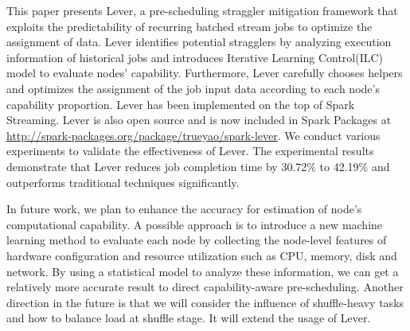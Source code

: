 \documentclass[10pt,conference,compsocconf,letterpaper]{IEEEtran}
\begin{document}
  This paper presents Lever, a pre-scheduling straggler mitigation framework that exploits the predictability of recurring batched stream jobs to optimize the assignment of data. Lever identifies potential stragglers by analyzing execution information of historical jobs and introduces Iterative Learning Control(ILC) model to evaluate nodes' capability. Furthermore, Lever carefully chooses helpers and optimizes the assignment of the job input data according to each node's capability proportion. Lever has been implemented on the top of Spark Streaming. Lever is also open source and is now included in Spark Packages at \url{http://spark-packages.org/package/trueyao/spark-lever}. We conduct various experiments to validate the effectiveness of Lever. The experimental results demonstrate that Lever reduces job completion time by 30.72\% to 42.19\% and outperforms traditional techniques significantly.

  In future work, we plan to enhance the accuracy for estimation of node's computational capability. A possible approach is to introduce a new machine learning method to evaluate each node by collecting the node-level features of hardware configuration and resource utilization such as CPU, memory, disk and network. By using a statistical model to analyze these information, we can get a relatively more accurate result to direct capability-aware pre-scheduling. Another direction in the future is that we will consider the influence of shuffle-heavy tasks and how to balance load at shuffle stage. It will extend the usage of Lever.





\end{document}

